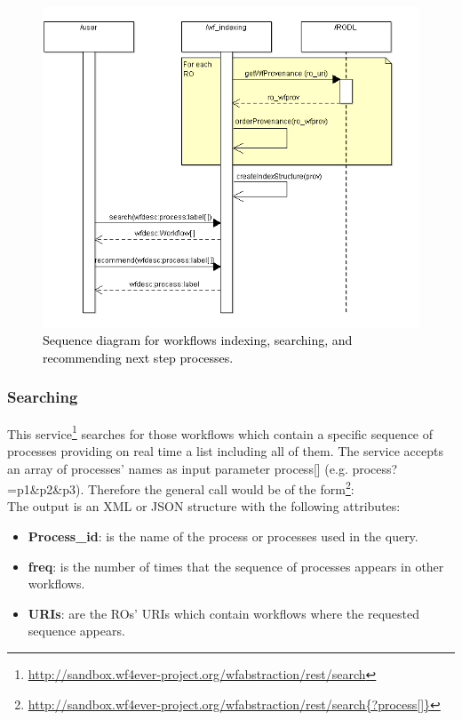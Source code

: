 \begin{figure}[ht!]
\centering
\includegraphics[scale=0.60]{Figures/sequence-indexing.png}
\caption{\textcolor{black}{Sequence diagram for workflows indexing, searching, and recommending next step processes. }}
\label{fig:sequence-indexing}
\end{figure}

\subsubsection{Searching}

This service\footnote{\url{http://sandbox.wf4ever-project.org/wfabstraction/rest/search}} searches for those workflows which contain a specific sequence of processes providing on real time a list including all of them. The service accepts an array of processes' names as input parameter process[] (e.g. process?=p1\&p2\&p3). Therefore the general call would be of the form\footnote{\url{http://sandbox.wf4ever-project.org/wfabstraction/rest/search{?process[]}}}:\\

The output is an XML or JSON structure with the following attributes: 
\begin{itemize}
\item \textbf{Process\_id}: is the name of the process or processes used in the query.
\item \textbf{freq}: is the number of times that the sequence of processes appears in other workflows.
\item \textbf{URIs}: are the ROs' URIs which contain workflows where the requested sequence appears. 
\end{itemize}


